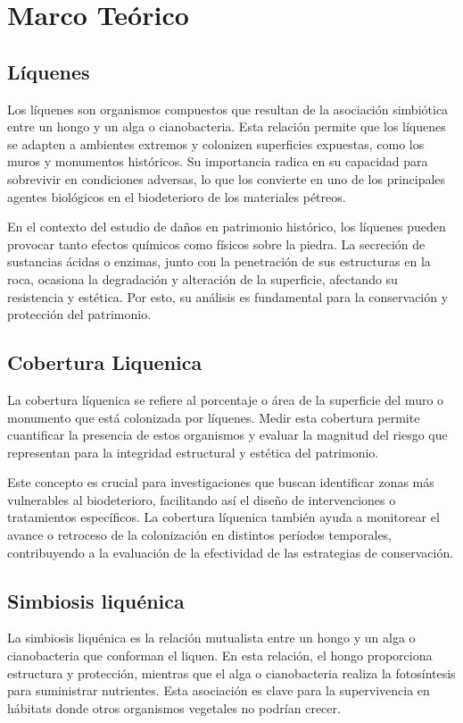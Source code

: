 \chapter{Marco Teórico}
\section{Líquenes}
Los líquenes son organismos compuestos que resultan de la asociación simbiótica entre un hongo y un alga o cianobacteria. Esta relación permite que los líquenes se adapten a ambientes extremos y colonizen superficies expuestas, como los muros y monumentos históricos. Su importancia radica en su capacidad para sobrevivir en condiciones adversas, lo que los convierte en uno de los principales agentes biológicos en el biodeterioro de los materiales pétreos.

En el contexto del estudio de daños en patrimonio histórico, los líquenes pueden provocar tanto efectos químicos como físicos sobre la piedra. La secreción de sustancias ácidas o enzimas, junto con la penetración de sus estructuras en la roca, ocasiona la degradación y alteración de la superficie, afectando su resistencia y estética. Por esto, su análisis es fundamental para la conservación y protección del patrimonio.

\section{Cobertura Liquenica}
La cobertura líquenica se refiere al porcentaje o área de la superficie del muro o monumento que está colonizada por líquenes. Medir esta cobertura permite cuantificar la presencia de estos organismos y evaluar la magnitud del riesgo que representan para la integridad estructural y estética del patrimonio.

Este concepto es crucial para investigaciones que buscan identificar zonas más vulnerables al biodeterioro, facilitando así el diseño de intervenciones o tratamientos específicos. La cobertura líquenica también ayuda a monitorear el avance o retroceso de la colonización en distintos períodos temporales, contribuyendo a la evaluación de la efectividad de las estrategias de conservación.

\section{Simbiosis liquénica}
La simbiosis liquénica es la relación mutualista entre un hongo y un alga o cianobacteria que conforman el liquen. En esta relación, el hongo proporciona estructura y protección, mientras que el alga o cianobacteria realiza la fotosíntesis para suministrar nutrientes. Esta asociación es clave para la supervivencia en hábitats donde otros organismos vegetales no podrían crecer.

